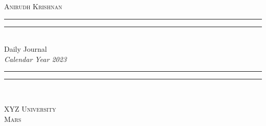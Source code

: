 \begin{titlepage}
\centering
	\settowidth{\unitlength}{\LARGE THE BOOK OF CONUNDRUMS}
	\vspace*{\baselineskip}
	{\large\scshape Anirudh Krishnan}\\[\baselineskip]
	\rule{\unitlength}{1.6pt}\vspace*{-\baselineskip}\vspace*{2pt}
	\rule{\unitlength}{0.4pt}\\[\baselineskip]
	{\LARGE Daily Journal}\\[\baselineskip]
	{\itshape Calendar Year 2023}\\[0.2\baselineskip]
	\rule{\unitlength}{0.4pt}\vspace*{-\baselineskip}\vspace{3.2pt}
	\rule{\unitlength}{1.6pt}\\[\baselineskip]
	\par
	\vfill
	{\large\scshape XYZ University}\\[\baselineskip]
	{\small\scshape Mars}\par
	\vspace*{0.1\textheight}
\end{titlepage}
